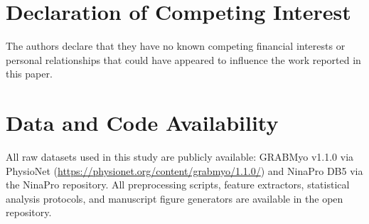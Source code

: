 \documentclass[final,5p,times,twocolumn]{elsarticle}
\begin{document}
\section*{Declaration of Competing Interest}
The authors declare that they have no known competing financial interests or personal relationships that could have appeared to influence the work reported in this paper.

\section*{Data and Code Availability}
All raw datasets used in this study are publicly available: GRABMyo v1.1.0 via PhysioNet (\url{https://physionet.org/content/grabmyo/1.1.0/}) and NinaPro DB5 via the NinaPro repository. All preprocessing scripts, feature extractors, statistical analysis protocols, and manuscript figure generators are available in the open repository.



\end{document}
